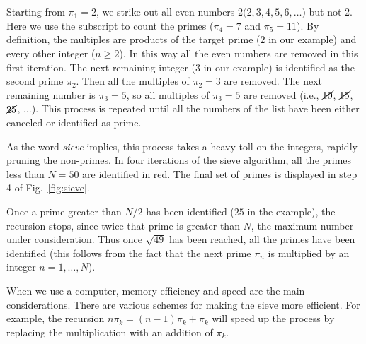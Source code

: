 \documentclass{ximera}
\begin{document}
Starting from $\pi_1 = 2$, we strike out all even numbers $2\dot(2, 3, 4, 5, 6, \dots)$ but not $2$. 
Here we use the subscript to count the primes ($\pi_4=7$ and $\pi_5=11$).
By definition,
the multiples are products of the target prime ($2$ in our example) and every other integer ($n\ge 2$).
In this way all the even numbers are removed in this first iteration.  The next remaining integer
($3$ in our example) is identified as the second prime $\pi_2$.  Then all the multiples of $\pi_2=3$
are removed.  The next remaining number is $\pi_3=5$, so all multiples of $\pi_3=5$ are removed
(i.e., $\cancel{10}$, $\cancel{15}$, {$\cancel{25}$}, $\dots$).  This process is repeated until
all the numbers of the list have been either canceled or identified as prime.

As the word \emph{sieve} implies, this process takes a heavy toll on the integers, rapidly pruning
the non-primes.  In four iterations of the sieve algorithm, all the primes less than $N=50$ are identified
in red.  The final set of primes is displayed in step 4 of Fig.~\ref{fig:sieve}.

Once a prime greater than $N/2$ has been identified ($25$ in the example), the recursion stops, since
twice that prime is greater than $N$, the maximum number under consideration.  Thus once $\sqrt{49}$
has been reached, all the primes have been identified (this follows from the fact that the next prime
$\pi_n$ is multiplied by an integer $n = 1, \ldots, N$).

When we use a computer, memory efficiency and speed are the main considerations.
There are various schemes for making the sieve more efficient. For example, the recursion $n\pi_k =
(n-1)\pi_k +\pi_k$ will speed up the process by replacing the multiplication with an addition of $\pi_k$.
\end{document}
